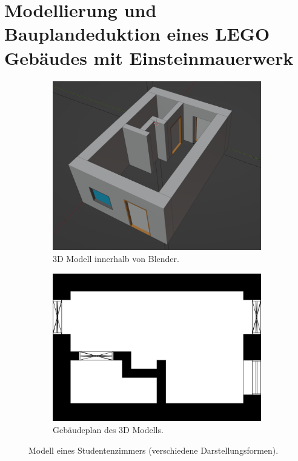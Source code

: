 \section{Modellierung und Bauplandeduktion eines LEGO Gebäudes mit Einsteinmauerwerk}\label{scenarios:scenario2}
\begin{figure}[ht]
  \begin{subfigure}[b]{0.44\columnwidth}
    \includegraphics[width=\columnwidth]{fig/scenario1_screenshot.png}
    \caption{3D Modell innerhalb von Blender.}
    \label{fig:Scenario1 Screenshot}
  \end{subfigure}
  \hfill
  \begin{subfigure}[b]{0.505\columnwidth}
    \includegraphics[width=\columnwidth]{fig/scenario1_story_plan.jpg}
    \caption{Gebäudeplan des 3D Modells.}
    \label{fig:Scenario1 Gebäudeplan}
  \end{subfigure}
  \label{fig:Scenario1 komplett}
  \caption{Modell eines Studentenzimmers (verschiedene Darstellungsformen).}
\end{figure}

